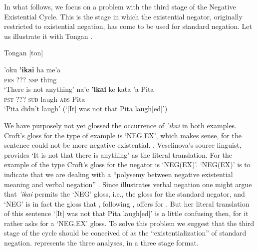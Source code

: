 ﻿\documentclass[output=paper]{langsci/langscibook}
\begin{document}
In what follows, we focus on a problem with the third stage of the Negative
Existential Cycle. This is the stage in which the existential negator,
originally restricted to existential negation, has come to be used for
standard negation. Let us illustrate it with Tongan 
\parencites(cp.)()[12]{Croft1991}[1342]{Veselinova2014}. 
%
\begin{exe}\ex\label{ex:int-tongan-anything-laugh}
          Tongan [ton] 
          \begin{xlist}
    \ex\label{ex:int-tongan-anything}
    \gll 'oku  \textbf{'ikai}  ha  me'a \\
    \textsc{prs}  ???  \textsc{nsp}  thing \\
    \glt `There is not anything'  
    \ex\label{ex:int-tongan-laugh}
    \gll na'e  \textbf{'ikai}  ke  kata  'a  Pita\\
\textsc{pst}  ???  \textsc{sub}  laugh  \textsc{abs}  Pita\\
    \glt `Pita didn't laugh' (`[It] was not that Pita laugh[ed]')
    \end{xlist}\end{exe}
%
We have purposely not yet glossed the occurrence of \textit{'ikai} in
both examples. Croft's gloss for the  type of example is
`NEG.EX', which makes sense, for the sentence could not be more negative
existential. \textcite[101]{Broschart1999}, Veselinova's source linguist,
provides `It is not that there is anything' as the literal translation. For
the example of the  type Croft's gloss for the negator is
`NEG(EX)'. `NEG(EX)' is to indicate that we are dealing with a ``polysemy
between negative existential meaning and verbal negation''
\parencite[12]{Croft1991}. Since  illustrates verbal negation
one might argue that \textit{'ikai} permits the `NEG' gloss, i.e., the
gloss for the standard negator, and `NEG' is in fact the gloss that
\textcite[1342]{Veselinova2014}, following \textcite[104]{Broschart1999}, offers
for . But her literal translation of this sentence `[It]
was not that Pita laugh[ed]' \parencite[in line again with][104]{Broschart1999}
 is a little confusing then, for it rather asks for a `NEG.EX' gloss.
To solve this problem we suggest that the third stage of the cycle should
be conceived of as the ``existentialization'' of standard negation.
 represents the three analyses, in a three stage format.
\end{document}
